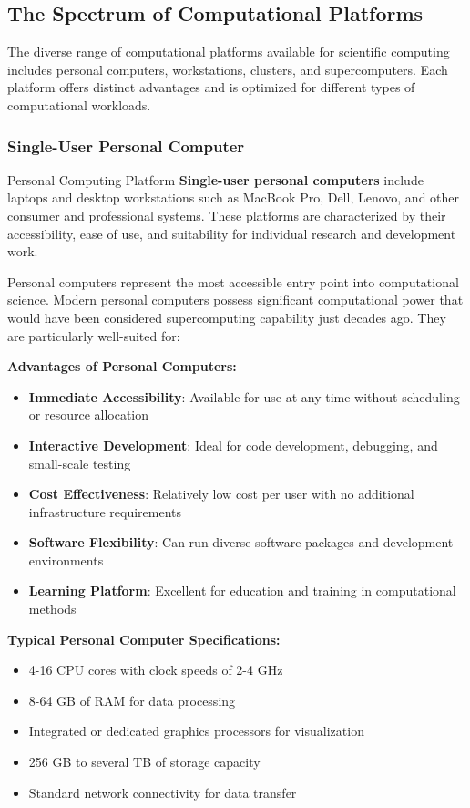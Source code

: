 \subsection{The Spectrum of Computational Platforms}

The diverse range of computational platforms available for scientific computing includes personal computers, workstations, clusters, and supercomputers. Each platform offers distinct advantages and is optimized for different types of computational workloads.

\subsubsection{Single-User Personal Computer}

\begin{conceptcard}{Personal Computing Platform}
\textbf{Single-user personal computers} include laptops and desktop workstations such as MacBook Pro, Dell, Lenovo, and other consumer and professional systems. These platforms are characterized by their accessibility, ease of use, and suitability for individual research and development work.
\end{conceptcard}

Personal computers represent the most accessible entry point into computational science. Modern personal computers possess significant computational power that would have been considered supercomputing capability just decades ago. They are particularly well-suited for:

\textbf{Advantages of Personal Computers:}
\begin{itemize}
    \item \textbf{Immediate Accessibility}: Available for use at any time without scheduling or resource allocation
    \item \textbf{Interactive Development}: Ideal for code development, debugging, and small-scale testing
    \item \textbf{Cost Effectiveness}: Relatively low cost per user with no additional infrastructure requirements
    \item \textbf{Software Flexibility}: Can run diverse software packages and development environments
    \item \textbf{Learning Platform}: Excellent for education and training in computational methods
\end{itemize}

\textbf{Typical Personal Computer Specifications:}
\begin{itemize}
    \item 4-16 CPU cores with clock speeds of 2-4 GHz
    \item 8-64 GB of RAM for data processing
    \item Integrated or dedicated graphics processors for visualization
    \item 256 GB to several TB of storage capacity
    \item Standard network connectivity for data transfer
\end{itemize}

